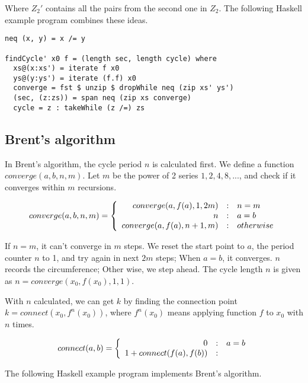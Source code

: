 \documentclass{article}
\begin{document}
Where $Z_2'$ contains all the pairs from the second one in $Z_2$. The following Haskell example program
combines these ideas.

\lstset{language=Haskell}
\begin{lstlisting}
neq (x, y) = x /= y

findCycle' x0 f = (length sec, length cycle) where
  xs@(x:xs') = iterate f x0
  ys@(y:ys') = iterate (f.f) x0
  converge = fst $ unzip $ dropWhile neq (zip xs' ys')
  (sec, (z:zs)) = span neq (zip xs converge)
  cycle = z : takeWhile (z /=) zs
\end{lstlisting}

\subsection{Brent's algorithm}
In Brent's algorithm, the cycle period $n$ is calculated first. We define a function $converge(a, b, n, m)$.
Let $m$ be the power of 2 series $1, 2, 4, 8, ...$, and check if it converges within $m$ recursions.

\begin{equation}
converge(a, b, n, m) = \left \{
  \begin{array}
  {r@{\quad:\quad}l}
  converge(a, f(a), 1, 2m) & n = m \\
  n & a = b \\
  converge(a, f(a), n+1, m) & otherwise
  \end{array}
\right.
\end{equation}

If $n=m$, it can't converge in $m$ steps. We reset the start point to $a$, the period counter
$n$ to 1, and try again in next $2m$ steps; When $a = b$, it converges. $n$ records the circumference; Other
wise, we step ahead. The cycle length $n$ is given as $n = converge(x_0, f(x_0), 1, 1)$.

With $n$ calculated, we can get $k$ by finding the connection point $k = connect(x_0, f^n(x_0))$, where
$f^n(x_0)$ means applying function $f$ to $x_0$ with $n$ times.

\begin{equation}
connect(a, b) = \left \{
  \begin{array}
  {r@{\quad:\quad}l}
  0 & a = b \\
  1 + connect(f(a), f(b))
  \end{array}
\right.
\end{equation}

The following Haskell example program implements Brent's algorithm.
\end{document}

